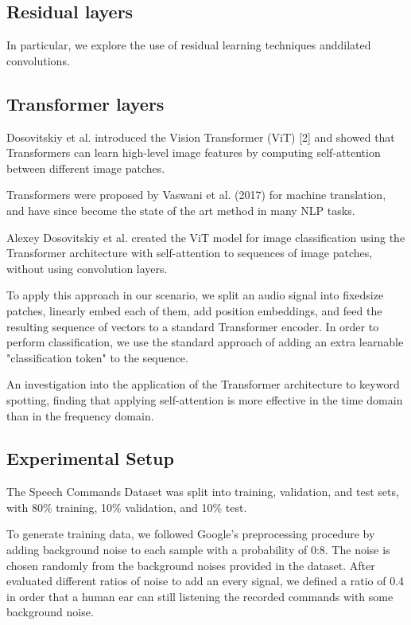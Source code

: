 \subsection{Residual layers}
In particular, we explore the use of residual learning techniques anddilated convolutions.


\subsection{Transformer layers}

Dosovitskiy et al. introduced the Vision Transformer (ViT) [2] and showed that Transformers can learn high-level image features by computing self-attention between different image patches. 	

Transformers were proposed by Vaswani et al. (2017) for machine translation, and have since become the state of the art method in many NLP tasks.
	 	 	 		
Alexey Dosovitskiy et al. created the ViT model for image classification using the Transformer architecture with self-attention to sequences of image patches, without using convolution layers.
	
 To apply this approach in our scenario, we split an audio signal into fixed\-size patches, linearly embed each of them, add position embeddings, and feed the resulting sequence of vectors to a standard Transformer encoder. In order to perform classification, we use the standard approach of adding an extra learnable "classification token" to the sequence.


An investigation into the application of the Transformer architecture to keyword spotting, finding that applying self-attention is more effective in the time domain than in the frequency domain.



\subsection{Experimental Setup}

The Speech Commands Dataset was
split into training, validation, and test sets, with 80\% training,
10\% validation, and 10\% test.

To generate training data, we followed Google's preprocessing
procedure by adding background noise to each
sample with a probability of 0:8. The noise is chosen randomly from the background noises provided
in the dataset. After evaluated different ratios of noise to add an every signal, we defined a ratio of 0.4 in order that a human ear can still listening the recorded commands with some background noise. 


